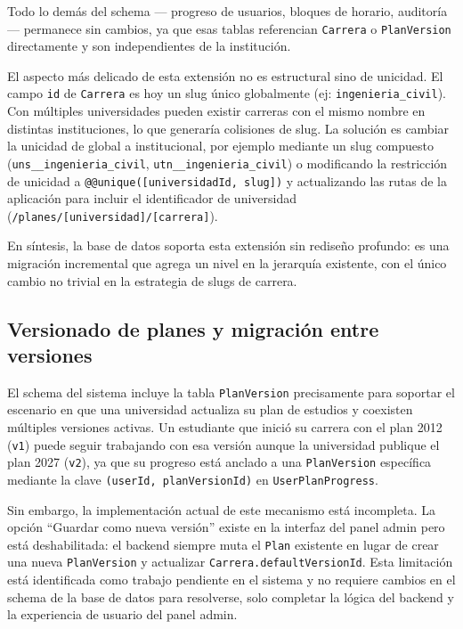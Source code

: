 \documentclass[12pt, a4paper]{report}
\begin{document}
Todo lo demás del schema --- progreso de usuarios, bloques de horario, auditoría ---
permanece sin cambios, ya que esas tablas referencian \texttt{Carrera} o
\texttt{PlanVersion} directamente y son independientes de la institución.

El aspecto más delicado de esta extensión no es estructural sino de unicidad. El campo
\texttt{id} de \texttt{Carrera} es hoy un slug único globalmente
(ej: \texttt{ingenieria\_civil}). Con múltiples universidades pueden existir carreras con
el mismo nombre en distintas instituciones, lo que generaría colisiones de slug. La
solución es cambiar la unicidad de global a institucional, por ejemplo mediante un slug
compuesto (\texttt{uns\_\_ingenieria\_civil}, \texttt{utn\_\_ingenieria\_civil}) o
modificando la restricción de unicidad a \texttt{@@unique([universidadId, slug])} y
actualizando las rutas de la aplicación para incluir el identificador de universidad
(\texttt{/planes/[universidad]/[carrera]}).

En síntesis, la base de datos soporta esta extensión sin rediseño profundo: es una
migración incremental que agrega un nivel en la jerarquía existente, con el único cambio
no trivial en la estrategia de slugs de carrera.

\subsection{Versionado de planes y migración entre versiones}

El schema del sistema incluye la tabla \texttt{PlanVersion} precisamente para soportar
el escenario en que una universidad actualiza su plan de estudios y coexisten múltiples
versiones activas. Un estudiante que inició su carrera con el plan 2012 (\texttt{v1}) puede
seguir trabajando con esa versión aunque la universidad publique el plan 2027 (\texttt{v2}),
ya que su progreso está anclado a una \texttt{PlanVersion} específica mediante la clave
\texttt{(userId, planVersionId)} en \texttt{UserPlanProgress}.

Sin embargo, la implementación actual de este mecanismo está incompleta. La opción
``Guardar como nueva versión'' existe en la interfaz del panel admin pero está
deshabilitada: el backend siempre muta el \texttt{Plan} existente en lugar de crear una
nueva \texttt{PlanVersion} y actualizar \texttt{Carrera.defaultVersionId}. Esta
limitación está identificada como trabajo pendiente en el sistema y no requiere cambios
en el schema de la base de datos para resolverse, solo completar la lógica del backend y
la experiencia de usuario del panel admin.
\end{document}
